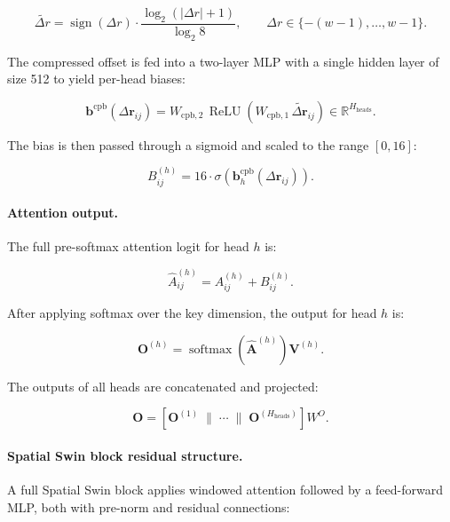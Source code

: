 \begin{equation}
    \tilde{\Delta r} = \operatorname{sign}(\Delta r) \cdot \frac{\log_2(|\Delta r| + 1)}{\log_2 8},
    \qquad \Delta r \in \{-(w-1), \ldots, w-1\}.
\end{equation}

The compressed offset is fed into a two-layer MLP with a single hidden layer of size 512 to yield per-head biases:

\begin{equation}
    \mathbf{b}^{\text{cpb}}(\Delta\mathbf{r}_{ij}) = W_{\text{cpb},2}\,\operatorname{ReLU}\!\left(W_{\text{cpb},1}\,\tilde{\Delta\mathbf{r}}_{ij}\right) \in \mathbb{R}^{H_{\text{heads}}}.
\end{equation}

The bias is then passed through a sigmoid and scaled to the range $[0, 16]$:

\begin{equation}
    B^{(h)}_{ij} = 16 \cdot \sigma\!\left(\mathbf{b}^{\text{cpb}}_{h}(\Delta\mathbf{r}_{ij})\right).
\end{equation}

\paragraph{Attention output.}
The full pre-softmax attention logit for head $h$ is:

\begin{equation}
    \hat{A}^{(h)}_{ij} = A^{(h)}_{ij} + B^{(h)}_{ij}.
\end{equation}

After applying softmax over the key dimension, the output for head $h$ is:

\begin{equation}
    \mathbf{O}^{(h)} = \operatorname{softmax}\!\left(\hat{\mathbf{A}}^{(h)}\right) \mathbf{V}^{(h)}.
\end{equation}

The outputs of all heads are concatenated and projected:

\begin{equation}
    \mathbf{O} = \left[\mathbf{O}^{(1)} \;\|\; \cdots \;\|\; \mathbf{O}^{(H_{\text{heads}})}\right] W^O.
\end{equation}

\paragraph{Spatial Swin block residual structure.}
A full Spatial Swin block applies windowed attention followed by a feed-forward MLP, both with pre-norm and residual connections:

